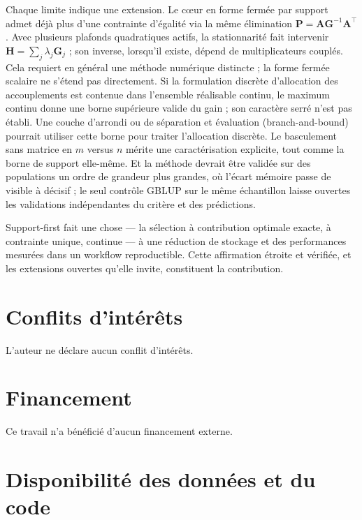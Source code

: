 \documentclass[11pt]{article}
\newcommand{\tp}{^{\top}}
\newcommand{\bG}{\mathbf{G}}
\newcommand{\bA}{\mathbf{A}}
\begin{document}
Chaque limite indique une extension. Le c\oe ur en forme fermée par support admet déjà plus d'une contrainte d'égalité via la même élimination $\mathbf{P}=\bA\bG^{-1}\bA\tp$. Avec plusieurs plafonds quadratiques actifs, la stationnarité fait intervenir $\mathbf{H}=\sum_j\lambda_j\bG_j$ ; son inverse, lorsqu'il existe, dépend de multiplicateurs couplés. Cela requiert en général une méthode numérique distincte ; la forme fermée scalaire ne s'étend pas directement. Si la formulation discrète d'allocation des accouplements est contenue dans l'ensemble réalisable continu, le maximum continu donne une borne supérieure valide du gain ; son caractère serré n'est pas établi. Une couche d'arrondi ou de séparation et évaluation (branch-and-bound) pourrait utiliser cette borne pour traiter l'allocation discrète. Le basculement sans matrice en $m$ versus $n$ mérite une caractérisation explicite, tout comme la borne de support elle-même. Et la méthode devrait être validée sur des populations un ordre de grandeur plus grandes, où l'écart mémoire passe de visible à décisif ; le seul contrôle GBLUP sur le même échantillon laisse ouvertes les validations indépendantes du critère et des prédictions.

Support-first fait une chose --- la sélection à contribution optimale exacte, à contrainte unique, continue --- à une réduction de stockage et des performances mesurées dans un workflow reproductible. Cette affirmation étroite et vérifiée, et les extensions ouvertes qu'elle invite, constituent la contribution.

\section*{Conflits d'intérêts}
L'auteur ne déclare aucun conflit d'intérêts.

\section*{Financement}
Ce travail n'a bénéficié d'aucun financement externe.

\section*{Disponibilité des données et du code}
\end{document}
